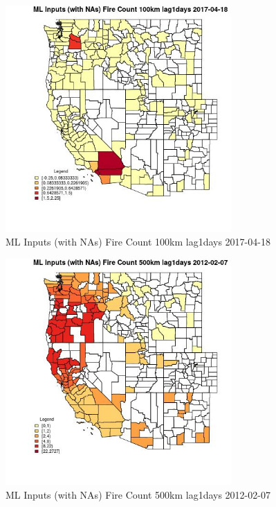 \begin{figure} 
\centering  
\includegraphics[width=0.77\textwidth]{Code_Outputs/Report_ML_input_PM25_Step4_part_f_de_duplicated_aves_prioritize_24hr_obswNAs_CountyFire_Count_100km_lag1daysMean2017-04-18.jpg} 
\caption{\label{fig:Report_ML_input_PM25_Step4_part_f_de_duplicated_aves_prioritize_24hr_obswNAsCountyFire_Count_100km_lag1daysMean2017-04-18}ML Inputs (with NAs) Fire Count 100km lag1days 2017-04-18} 
\end{figure} 
 

\begin{figure} 
\centering  
\includegraphics[width=0.77\textwidth]{Code_Outputs/Report_ML_input_PM25_Step4_part_f_de_duplicated_aves_prioritize_24hr_obswNAs_CountyFire_Count_500km_lag1daysMean2012-02-07.jpg} 
\caption{\label{fig:Report_ML_input_PM25_Step4_part_f_de_duplicated_aves_prioritize_24hr_obswNAsCountyFire_Count_500km_lag1daysMean2012-02-07}ML Inputs (with NAs) Fire Count 500km lag1days 2012-02-07} 
\end{figure} 
 

